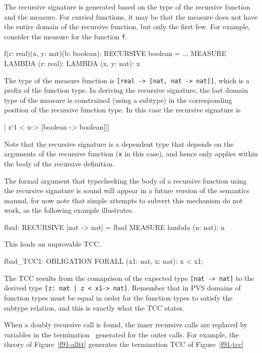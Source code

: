 The recursive signature is generated based on the type of the recursive
function and the measure.  For curried functions, it may be that the
measure does not have the entire domain of the recursive function, but
only the first few.  For example, consider the measure for the function
\texttt{f}.
\begin{pvsex}
  f(r: real)(x, y: nat)(b: boolean): RECURSIVE boolean
    = ...
   MEASURE LAMBDA (r: real): LAMBDA (x, y: nat): x
\end{pvsex}
The type of the measure function is \texttt{[real -> [nat, nat -> nat]]},
which is a prefix of the function type.  In deriving the recursive
signature, the last domain type of the measure is constrained (using a
subtype) in the corresponding position of the recursive function type.  In
this case the recursive signature is
\begin{pvsex}
  [real -> [\setb{}z: [nat, nat] | z`1 < x\sete -> [boolean -> boolean]]]
\end{pvsex}
Note that the recursive signature is a dependent type that depends on the
arguments of the recursive function (\texttt{x} in this case), and hence
only applies within the body of the recursive definition.

The formal argument that typechecking the body of a recursive function
using the recursive signature is sound will appear in a future version of
the semantics manual, for now note that simple attempts to subvert this
mechanism do not work, as the following example illustrates.
\begin{pvsex}
  fbad: RECURSIVE [nat -> nat] = fbad
   MEASURE lambda (n: nat): n
\end{pvsex}
This leads an unprovable TCC.
\begin{pvsex}
  fbad_TCC1: OBLIGATION FORALL (x1: nat, x: nat): x < x1;
\end{pvsex}
The TCC results from the comaprison of the expected type \texttt{[nat ->
nat]} to the derived type \texttt{[\setb{}z:\ nat | z < x1\sete -> nat]}.  Remember
that in PVS domains of function types must be equal in order for the
function types to satisfy the subtype relation, and this is exactly what
the TCC states.


When a doubly recursive call is found, the inner recursive calls are
replaced by variables in the termination \tccs\ generated for the outer
calls.  For example, the theory of Figure~\ref{f91-alltt} generates the
termination TCC of Figure~\ref{f91-tcc}

